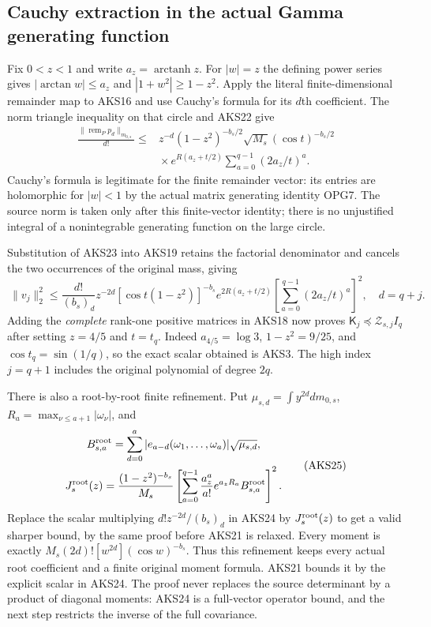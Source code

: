 \subsection{Cauchy extraction in the actual Gamma generating function}
Fix $0<z<1$ and write $a_z=\operatorname{arctanh}z$.
For $|w|=z$ the defining power series gives
$|\arctan w|\le a_z$ and $|1+w^2|\ge1-z^2$.
Apply the literal finite-dimensional remainder map to AKS16 and use
Cauchy's formula for its $d$th coefficient. The norm triangle inequality
on that circle and AKS22 give
\[
\begin{split}
 \frac{\|\operatorname{rem}_P p_d\|_{m_{0,s}}}{d!}
 \le{}&z^{-d}(1-z^2)^{-b_s/2}\sqrt{M_s}(\cos t)^{-b_s/2}\\
 &\mathrel{}\times e^{R(a_z+t/2)}
                    \sum_{a=0}^{q-1}(2a_z/t)^a.
\end{split}\tag{AKS23}
\]
Cauchy's formula is legitimate for the finite remainder vector: its
entries are holomorphic for $|w|<1$ by the actual matrix generating
identity OPG7. The source norm is taken only after this finite-vector
identity; there is no unjustified integral of a nonintegrable generating
function on the large circle.

Substitution of AKS23 into AKS19 retains the factorial denominator and
cancels the two occurrences of the original mass, giving
\[
 \boxed{\ 
 \|v_j\|_2^2\le\frac{d!}{(b_s)_d}z^{-2d}
 [\cos t(1-z^2)]^{-b_s}e^{2R(a_z+t/2)}
 \left[\sum_{a=0}^{q-1}(2a_z/t)^a\right]^2,
 \quad d=q+j.\ }
 \tag{AKS24}
\]
Adding the \emph{complete} rank-one positive matrices in AKS18 now proves
$\mathsf K_j\preceq \mathcal Z_{s,j}I_q$ after setting $z=4/5$ and $t=t_q$.
Indeed $a_{4/5}=\log3$, $1-z^2=9/25$, and $\cos t_q=\sin(1/q)$, so
the exact scalar obtained is AKS3. The high index $j=q+1$ includes the
original polynomial of degree $2q$.

There is also a root-by-root finite refinement. Put
$\mu_{s,d}=\int y^{2d}dm_{0,s}$,
$R_a=\max_{\nu\le a+1}|\omega_\nu|$, and
\[
\begin{gathered}
 B_{s,a}^{\rm root}=\sum_{d=0}^a
     |e_{a-d}(\omega_1,\ldots,\omega_a)|\sqrt{\mu_{s,d}},\\
 J_s^{\rm root}(z)=\frac{(1-z^2)^{-b_s}}{M_s}
 \left[\sum_{a=0}^{q-1}\frac{a_z^a}{a!}e^{a_zR_a}
                      B_{s,a}^{\rm root}\right]^2.
\end{gathered}\tag{AKS25}
\]
Replace the scalar multiplying
$d!z^{-2d}/(b_s)_d$ in AKS24 by $J_s^{\rm root}(z)$ to get a valid
sharper bound, by the same proof before AKS21 is relaxed. Every moment
is exactly $M_s(2d)![w^{2d}](\cos w)^{-b_s}$. Thus this refinement keeps
every actual root coefficient and a finite original moment formula.
AKS21 bounds it by the explicit scalar in AKS24. The proof never replaces
the source determinant by a product of diagonal moments: AKS24 is a
full-vector operator bound, and the next step restricts the inverse of
the full covariance.

